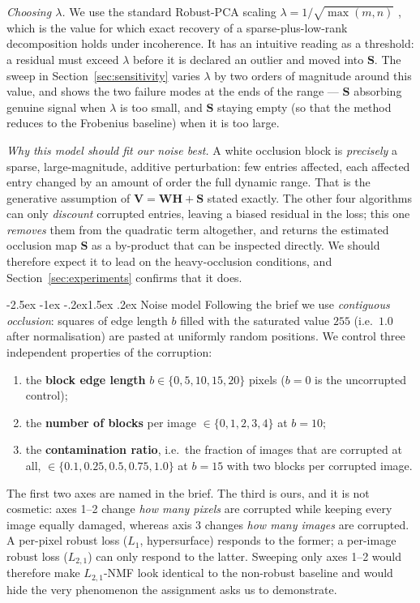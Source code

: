 \documentclass[12pt,a4paper]{article}
\makeatletter
\renewcommand\subsection{\@startsection{subsection}{2}{\z@}%
    {-2.5ex \@plus -1ex \@minus -.2ex}{1.5ex \@plus.2ex}%
    {\normalfont\fontsize{12}{14}\bfseries}}
\newcommand{\bV}{\bm{V}}
\newcommand{\bW}{\bm{W}}
\newcommand{\bH}{\bm{H}}
\newcommand{\bS}{\bm{S}}
\makeatother
\begin{document}
\emph{Choosing $\lambda$.} We use the standard Robust-PCA scaling
$\lambda = 1/\sqrt{\max(m,n)}$ \citep{candes2011robust}, which is the value for
which exact recovery of a sparse-plus-low-rank decomposition holds under
incoherence. It has an intuitive reading as a threshold: a residual must exceed
$\lambda$ before it is declared an outlier and moved into $\bS$. The sweep in
Section~\ref{sec:sensitivity} varies $\lambda$ by two orders of magnitude
around this value, and shows the two failure modes at the ends of the range
--- $\bS$ absorbing genuine signal when $\lambda$ is too small, and $\bS$
staying empty (so that the method reduces to the Frobenius baseline) when it is
too large.

\emph{Why this model should fit our noise best.} A white occlusion block is
\emph{precisely} a sparse, large-magnitude, additive perturbation: few entries
affected, each affected entry changed by an amount of order the full dynamic
range. That is the generative assumption of $\bV = \bW\bH + \bS$ stated
exactly. The other four algorithms can only \emph{discount} corrupted entries,
leaving a biased residual in the loss; this one \emph{removes} them from the
quadratic term altogether, and returns the estimated occlusion map $\bS$ as a
by-product that can be inspected directly. We should therefore expect it to
lead on the heavy-occlusion conditions, and Section~\ref{sec:experiments}
confirms that it does.

\subsection{Noise model}
\label{sec:noise}
Following the brief we use \emph{contiguous occlusion}: squares of edge length
$b$ filled with the saturated value $255$ (i.e.\ $1.0$ after normalisation)
are pasted at uniformly random positions. We control three independent
properties of the corruption:
\begin{enumerate}\itemsep0pt
  \item the \textbf{block edge length} $b \in \{0,5,10,15,20\}$ pixels
        ($b=0$ is the uncorrupted control);
  \item the \textbf{number of blocks} per image $\in \{0,1,2,3,4\}$ at $b=10$;
  \item the \textbf{contamination ratio}, i.e.\ the fraction of images that
        are corrupted at all, $\in \{0.1, 0.25, 0.5, 0.75, 1.0\}$ at $b=15$
        with two blocks per corrupted image.
\end{enumerate}
The first two axes are named in the brief. The third is ours, and it is not
cosmetic: axes 1--2 change \emph{how many pixels} are corrupted while keeping
every image equally damaged, whereas axis 3 changes \emph{how many images} are
corrupted. A per-pixel robust loss ($L_1$, hypersurface) responds to the
former; a per-image robust loss ($L_{2,1}$) can only respond to the latter.
Sweeping only axes 1--2 would therefore make $L_{2,1}$-NMF look identical to
the non-robust baseline and would hide the very phenomenon the assignment asks
us to demonstrate.
\end{document}
